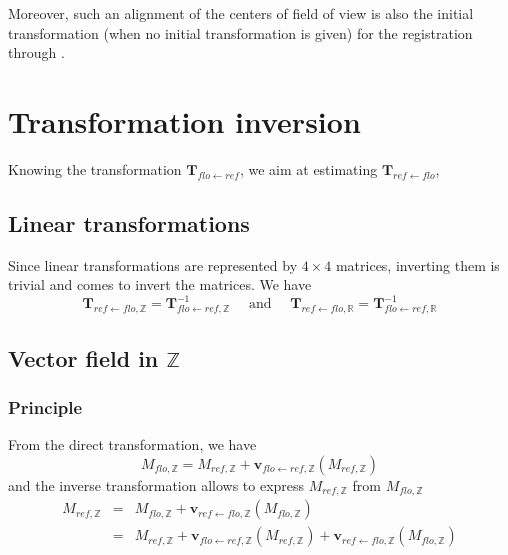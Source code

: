 Moreover, such an alignment of the centers of field of view is also the initial transformation (when no initial transformation is given) for the registration through \blockmatching{}.


\section{Transformation inversion}

Knowing the transformation $\mathbf{T}_{flo \leftarrow ref}$, we aim at estimating $\mathbf{T}_{ref \leftarrow flo}$,

\subsection{Linear transformations}

Since linear transformations are represented by $4 \times 4$ matrices, inverting them is trivial and comes to invert the matrices. We have
\begin{displaymath}
\mathbf{T}_{ref \leftarrow flo, \mathbb{Z}} =
\mathbf{T}_{flo \leftarrow ref, \mathbb{Z}}^{-1}
\quad \mbox{ and } \quad
\mathbf{T}_{ref \leftarrow flo, \mathbb{R}} =
\mathbf{T}_{flo \leftarrow ref, \mathbb{R}}^{-1}
\end{displaymath}

\subsection{Vector field in $\mathbb{Z}$}

\subsubsection{Principle}

From the direct transformation, we have
\begin{displaymath}
M_{flo,\mathbb{Z}} = 
M_{ref,\mathbb{Z}} 
+ \mathbf{v}_{flo \leftarrow ref, \mathbb{Z}}(M_{ref,\mathbb{Z}} )
\end{displaymath}
and the inverse transformation allows to express $M_{ref,\mathbb{Z}}$ from $M_{flo,\mathbb{Z}}$
\begin{eqnarray*}
M_{ref,\mathbb{Z}} & = &
M_{flo,\mathbb{Z}} 
+ \mathbf{v}_{ref \leftarrow flo, \mathbb{Z}}(M_{flo,\mathbb{Z}} ) \\
& = &
M_{ref,\mathbb{Z}} 
+ \mathbf{v}_{flo \leftarrow ref, \mathbb{Z}}(M_{ref,\mathbb{Z}} )
+ \mathbf{v}_{ref \leftarrow flo, \mathbb{Z}}(M_{flo,\mathbb{Z}} )
\end{eqnarray*}

